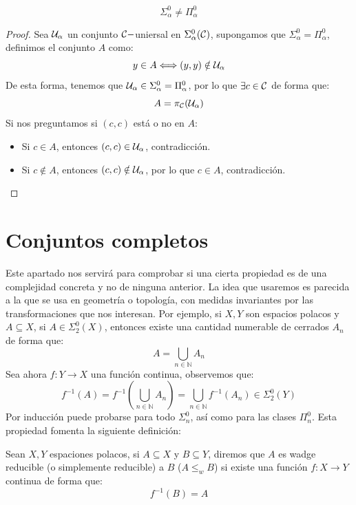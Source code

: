 \begin{lema}
    \begin{equation*}
        \Sigma^0_\alpha \neq \Pi^0_\alpha
    \end{equation*}
    \begin{proof}
        Sea $\mathcal{U}_\alpha$ un conjunto $\mathcal{C}-$uniersal en $\Sigma^0_\alpha(\mathcal{C})$, supongamos que $\Sigma^0_\alpha = \Pi^0_\alpha$, definimos el conjunto $A$ como:
        \begin{equation*}
            y\in A \Longleftrightarrow (y,y) \notin \mathcal{U}_\alpha
        \end{equation*}
        De esta forma, tenemos que $\mathcal{U}_\alpha\in \Sigma^0_\alpha = \Pi^0_\alpha$, por lo que $\exists c\in \mathcal{C}$ de forma que:
        \begin{equation*}
            A = \pi_{\mathcal{C}}(\mathcal{U}_\alpha)
        \end{equation*}
        Si nos preguntamos si $(c,c)$ está o no en $A$:
        \begin{itemize}
            \item Si $c\in A$, entonces $(c,c)\in \mathcal{U}_\alpha$, contradicción.
            \item Si $c\notin A$, entonces $(c,c)\notin \mathcal{U}_{\alpha}$, por lo que $c\in A$, contradicción.
        \end{itemize}
    \end{proof}
\end{lema}

\section{Conjuntos completos}
Este apartado nos servirá para comprobar si una cierta propiedad es de una complejidad concreta y no de ninguna anterior. La idea que usaremos es parecida a la que se usa en geometría o topología, con medidas invariantes por las transformaciones que nos interesan. Por ejemplo, si $X,Y$ son espacios polacos y $A\subseteq X$, si $A\in \Sigma^0_2(X)$, entonces existe una cantidad numerable de cerrados $A_n$ de forma que:
\begin{equation*}
    A = \bigcup_{n\in \mathbb{N}} A_n
\end{equation*}
Sea ahora $f:Y\to X$ una función continua, observemos que:
\begin{equation*}
    f^{-1}(A) = f^{-1}\left(\bigcup_{n\in \mathbb{N}}A_n\right) = \bigcup_{n\in \mathbb{N}}f^{-1}(A_n) \in \Sigma^0_2(Y)
\end{equation*}
Por inducción puede probarse para todo $\Sigma^0_n$, así como para las clases $\Pi^0_n$.
Esta propiedad fomenta la siguiente definición:
\begin{definicion}
    Sean $X,Y$ espaciones polacos, si $A\subseteq X$ y $B\subseteq Y$, diremos que $A$ es wadge reducible (o simplemente reducible) a $B$ ($A\leq_{w}B$) si existe una función $f:X\to Y$ continua de forma que:
    \begin{equation*}
        f^{-1}(B) = A
    \end{equation*}
\end{definicion}

